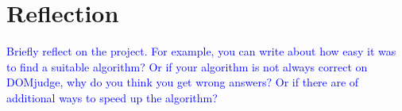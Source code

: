 \documentclass[a4paper]{article}
\newcommand{\instruction}[1]{\textcolor{blue}{#1}}
\begin{document}
\section{Reflection}
\instruction{Briefly reflect on the project. For example, you can write about how easy it was to find a suitable algorithm? Or if your algorithm is not always correct on DOMjudge, why do you think you get wrong answers? Or if there are of additional ways to speed up the algorithm?}
\end{document}
